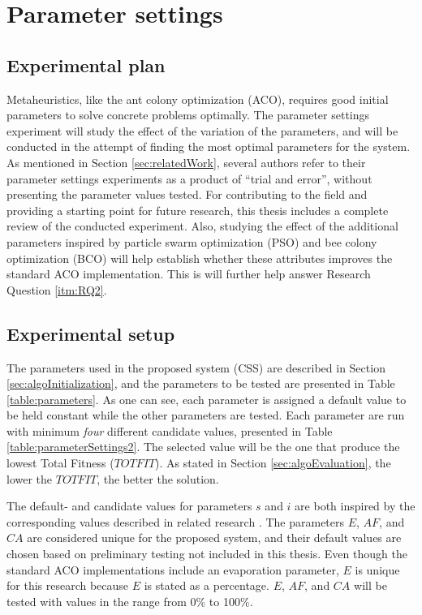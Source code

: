 \section{Parameter settings}
\label{sec:parametersettings}

\subsection{Experimental plan}
Metaheuristics, like the ant colony optimization (ACO), requires good initial parameters to solve concrete problems optimally. The parameter settings experiment will study the effect of the variation of the parameters, and will be conducted in the attempt of finding the most optimal parameters for the system. As mentioned in Section \vref{sec:relatedWork}, several authors refer to their parameter settings experiments as a product of ``trial and error'', without presenting the parameter values tested. For contributing to the field and providing a starting point for future research, this thesis includes a complete review of the conducted experiment. %
Also, studying the effect of the additional parameters inspired by particle swarm optimization (PSO) and bee colony optimization (BCO) will help establish whether these attributes improves the standard ACO implementation. This is will further help answer Research Question \vref{itm:RQ2}.

\subsection{Experimental setup}
\label{subsec:parameterSettings_setup}
The parameters used in the proposed system (CSS) are described in Section \vref{sec:algoInitialization}, and the parameters to be tested are presented in Table \ref{table:parameters}. As one can see, each parameter is assigned a default value to be held constant while the other parameters are tested. Each parameter are run with minimum \textit{four} different candidate values, presented in Table \vref{table:parameterSettings2}. The selected value will be the one that produce the lowest Total Fitness ($TOTFIT$). As stated in Section \vref{sec:algoEvaluation}, the lower the $TOTFIT$, the better the solution. 

The default- and candidate values for parameters $s$ and $i$ are both inspired by the corresponding values described in related research \citep{salehi-nezhad07, poorzahedy11, sedighpour14, kechagiopoulos14}. The parameters $E$, $AF$, and $CA$ are considered unique for the proposed system, and their default values are chosen based on preliminary testing not included in this thesis. Even though the standard ACO implementations include an evaporation parameter, $E$ is unique for this research because $E$ is stated as a percentage. $E$, $AF$, and $CA$ will be tested with values in the range from 0\% to 100\%. %

